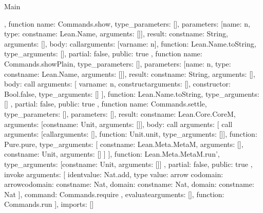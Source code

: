 \begin{lexlean}{Main}
\begin{toolingmodule}
{{    },
    function{
      name: Commands.show,
      type_parameters: [],
      parameters: [{name: n, type: const{name: Lean.Name, arguments: []}}],
      result: const{name: String, arguments: []},
      body: call{arguments: [var{name: n}], function: Lean.Name.toString, type_arguments: []},
      partial: false,
      public: true
    },
    function{
      name: Commands.showPlain,
      type_parameters: [],
      parameters: [{name: n, type: const{name: Lean.Name, arguments: []}}],
      result: const{name: String, arguments: []},
      body: call{
        arguments: [
          var{name: n},
          construct{arguments: [], constructor: Bool.false, type_arguments: []}
        ],
        function: Lean.Name.toString,
        type_arguments: []
      },
      partial: false,
      public: true
    },
    function{
      name: Commands.settle,
      type_parameters: [],
      parameters: [],
      result: const{name: Lean.Core.CoreM, arguments: [const{name: Unit, arguments: []}]},
      body: call{
        arguments: [
          call{
            arguments: [call{arguments: [], function: Unit.unit, type_arguments: []}],
            function: Pure.pure,
            type_arguments: [
              const{name: Lean.Meta.MetaM, arguments: []},
              const{name: Unit, arguments: []}
            ]
          }
        ],
        function: Lean.Meta.MetaM.run',
        type_arguments: [const{name: Unit, arguments: []}]
      },
      partial: false,
      public: true
    },
    invoke{
      arguments: [
        ident{value: Nat.add},
        type{
          value: arrow{
            codomain: arrow{codomain: const{name: Nat}, domain: const{name: Nat}},
            domain: const{name: Nat}
          }
        }
      ],
      command: Commands.require
    },
    evaluate{arguments: [], function: Commands.run}
  ],
  imports: []
}
\end{toolingmodule}
\end{lexlean}
